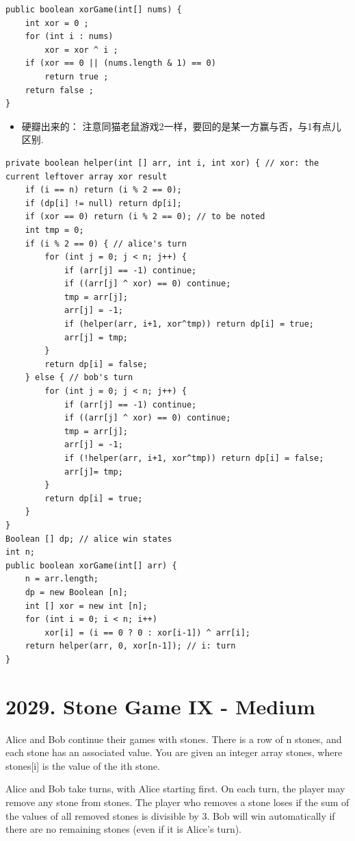 \documentclass[9pt, b5paaper]{book}
\begin{document}
\begin{verbatim}
public boolean xorGame(int[] nums) {
    int xor = 0 ;
    for (int i : nums) 
        xor = xor ^ i ;
    if (xor == 0 || (nums.length & 1) == 0)
        return true ;
    return false ;
}
\end{verbatim}
\begin{itemize}
\item 硬瓣出来的： 注意同猫老鼠游戏2一样，要回的是某一方赢与否，与1有点儿区别.
\end{itemize}
\begin{verbatim}
private boolean helper(int [] arr, int i, int xor) { // xor: the current leftover array xor result
    if (i == n) return (i % 2 == 0);
    if (dp[i] != null) return dp[i];
    if (xor == 0) return (i % 2 == 0); // to be noted
    int tmp = 0;
    if (i % 2 == 0) { // alice's turn
        for (int j = 0; j < n; j++) {
            if (arr[j] == -1) continue;
            if ((arr[j] ^ xor) == 0) continue;
            tmp = arr[j];
            arr[j] = -1;
            if (helper(arr, i+1, xor^tmp)) return dp[i] = true;
            arr[j] = tmp;
        }
        return dp[i] = false;
    } else { // bob's turn
        for (int j = 0; j < n; j++) {
            if (arr[j] == -1) continue;
            if ((arr[j] ^ xor) == 0) continue;
            tmp = arr[j];
            arr[j] = -1;
            if (!helper(arr, i+1, xor^tmp)) return dp[i] = false;
            arr[j]= tmp;
        }
        return dp[i] = true;
    }
}
Boolean [] dp; // alice win states
int n;
public boolean xorGame(int[] arr) {
    n = arr.length;
    dp = new Boolean [n];
    int [] xor = new int [n];
    for (int i = 0; i < n; i++) 
        xor[i] = (i == 0 ? 0 : xor[i-1]) ^ arr[i];
    return helper(arr, 0, xor[n-1]); // i: turn
}
\end{verbatim}

\section{2029. Stone Game IX - Medium}
\label{sec-2-22}
Alice and Bob continue their games with stones. There is a row of n stones, and each stone has an associated value. You are given an integer array stones, where stones[i] is the value of the ith stone.

Alice and Bob take turns, with Alice starting first. On each turn, the player may remove any stone from stones. The player who removes a stone loses if the sum of the values of all removed stones is divisible by 3. Bob will win automatically if there are no remaining stones (even if it is Alice's turn).
\end{document}
